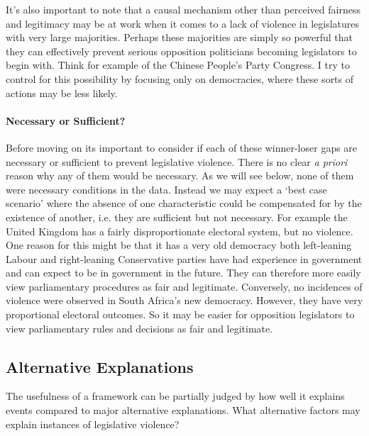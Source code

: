 \documentclass[a4paper]{article}\usepackage{graphicx, color}
\begin{document}
It's also important to note that a causal mechanism other than perceived fairness and legitimacy may be at work when it comes to a lack of violence in legislatures with very large majorities. Perhaps these majorities are simply so powerful that they can effectively prevent serious opposition politicians becoming legislators to begin with. Think for example of the Chinese People's Party Congress. I try to control for this possibility by focusing only on democracies, where these sorts of actions may be less likely.  

\paragraph{Necessary or Sufficient?}

Before moving on its important to consider if each of these winner-loser gaps are necessary or sufficient to prevent legislative violence. There is no clear \emph{a priori} reason why any of them would be necessary. As we will see below, none of them were necessary conditions in the data. Instead we may expect a `best case scenario' where the absence of one characteristic could be compensated for by the existence of another, i.e. they are sufficient but not necessary. For example the United Kingdom has a fairly disproportionate electoral system, but no violence. One reason for this might be that it has a very old democracy both left-leaning Labour and right-leaning Conservative parties have had experience in government and can expect to be in government in the future. They can therefore more easily view parliamentary procedures as fair and legitimate. Conversely, no incidences of violence were observed in South Africa's new democracy. However, they have very proportional electoral outcomes. So it may be easier for opposition legislators to view parliamentary rules and decisions as fair and legitimate.


\subsection{Alternative Explanations}

The usefulness of a framework can be partially judged by how well it explains events compared to major alternative explanations. What alternative factors may explain instances of legislative violence?
\end{document}
